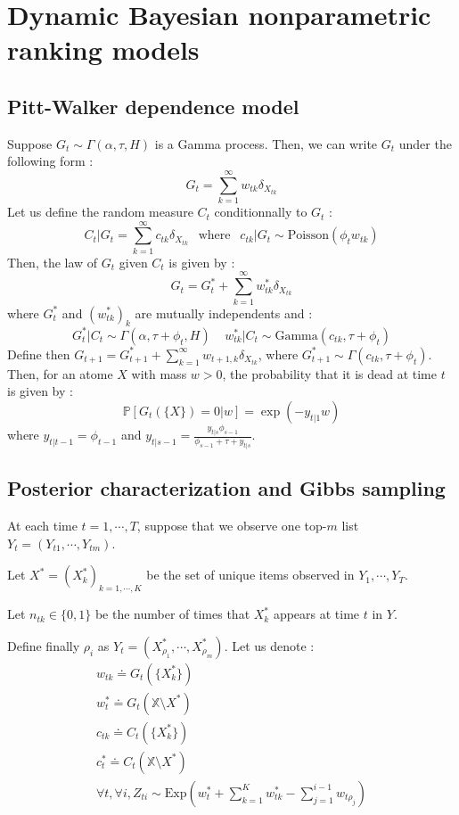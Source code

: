 \documentclass{article}
\begin{document}
\newpage

\section{Dynamic Bayesian nonparametric ranking models}

\subsection{Pitt-Walker dependence model}

Suppose $G_t\sim\Gamma(\alpha,\tau,H)$ is a Gamma process. Then, we can write $G_t$ under the following form :
\[
G_t = \sum_{k=1}^\infty w_{tk}\delta_{X_{tk}}
\]
Let us define the random measure $C_t$ conditionnally to $G_t$ :
\[
C_t\vert G_t = \sum_{k=1}^\infty c_{tk}\delta_{X_{tk}} ~~\text{ where } ~~ c_{tk}\vert G_t\sim\text{Poisson}\left(\phi_tw_{tk}\right)
\]
Then, the law of $G_t$ given $C_t$ is given by :
\[
G_t = G_t^*+\sum_{k=1}^\infty w_{tk}^*\delta_{X_{tk}}
\]
where $G_t^*$ and $(w_{tk}^*)_k$ are mutually independents and :
\[
G_t^*\vert C_t\sim\Gamma(\alpha,\tau+\phi_t,H) ~~~~~ w_{tk}^* \vert C_t\sim\text{Gamma}(c_{tk},\tau+\phi_t)
\]
Define then $G_{t+1}=G_{t+1}^*+\sum_{k=1}^\infty w_{t+1,k}\delta_{X_{tk}}$, where $G_{t+1}^*\sim\Gamma(c_{tk},\tau+\phi_t)$. Then, for an atome $X$ with mass $w>0$, the probability that it is dead at time $t$ is given by :
\[
\mathbb{P}\left[ G_t(\lbrace X\rbrace)=0 \vert w\right] = \exp(-y_{t\vert 1}w)
\]
where $y_{t\vert t-1}=\phi_{t-1}$ and $y_{t\vert s-1}=\frac{y_{t\vert s}\phi_{s-1}}{\phi_{s-1}+\tau+y_{t\vert s}}$.

\subsection{Posterior characterization and Gibbs sampling}

At each time $t=1,\cdots,T$, suppose that we observe one top-$m$ list $Y_t=(Y_{t1},\cdots,Y_{tm})$.

Let $X^*=(X_k^*)_{k=1,\cdots,K}$ be the set of unique items observed in $Y_1,\cdots,Y_T$.

Let $n_{tk}\in\lbrace 0,1\rbrace$ be the number of times that $X_k^*$ appears at time $t$ in $Y$.

Define finally $\rho_i$ as $Y_t=(X_{\rho_1}^*,\cdots,X_{\rho_m}^*)$.
Let us denote :
\[
\begin{array}{l}
w_{tk}\doteq G_t(\lbrace X_k^*\rbrace) \\
w_t^* \doteq G_t(\mathbb{X}\setminus X^*) \\
c_{tk}\doteq C_t(\lbrace X_k^*\rbrace) \\
c_t^* \doteq C_t(\mathbb{X}\setminus X^*) \\
\forall t, \forall i, Z_{ti}\sim\text{Exp}\left( w_t^*+\sum_{k=1}^Kw_{tk}^*-\sum_{j=1}^{i-1}w_{t\rho_j}\right)
\end{array}
\]
\end{document}

